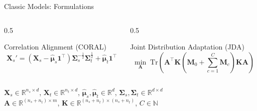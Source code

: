 \documentclass[aspectratio=169]{beamer}
\providecommand{\ve}[1]{{\bm{#1}}}
\begin{document}
\begin{frame}{Classic Models: Formulations}
    
    \begin{columns}[T] %
        
        \begin{column}{0.5\textwidth}
            \begin{custombox}{Correlation Alignment (CORAL)}
                \begin{equation*}
                    \ve{X}_s' = (\ve{X}_s - \hat{\ve{\mu}}_s \ve{1}^\top) \ve{\Sigma}_s^{-\frac{1}{2}} \ve{\Sigma}_t^{\frac{1}{2}} + \hat{\ve{\mu}}_t \ve{1}^\top
                \end{equation*}
            \end{custombox}
        \end{column}
        
        \begin{column}{0.5\textwidth}
            \begin{custombox}{Joint Distribution Adaptation (JDA)}
                \begin{equation*}
                    \min_{\ve{A}} \; \text{Tr}\left(\ve{A}^\top \ve{K} \left( \ve{M}_0 + \sum_{c=1}^C \ve{M}_c \right) \ve{K} \ve{A} \right)
                \end{equation*}
            \end{custombox}
        \end{column}
        
    \end{columns}
    
    \vspace{0.3cm} 
    \small 
    $\ve{X}_s \in \mathbb{R}^{n_s \times d}$, $\ve{X}_t \in \mathbb{R}^{n_t \times d}$, $\hat{\ve{\mu}}_s, \hat{\ve{\mu}}_t \in \mathbb{R}^d$, $\ve{\Sigma}_s, \ve{\Sigma}_t \in \mathbb{R}^{d \times d}$ \\
    $\ve{A} \in \mathbb{R}^{(n_s+n_t) \times m}$, $\ve{K} \in \mathbb{R}^{(n_s+n_t)\times(n_s+n_t)}$, $C \in \mathbb{N}$

\end{frame}
\end{document}
